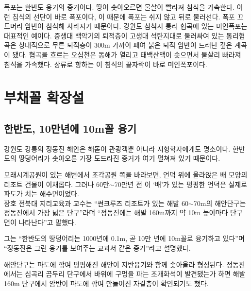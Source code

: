 \documentclass[12pt,a4paper]{book}
\newcommand{\SectionMargin}			{\newpage  \null \vskip 0cm}
\begin{document}
폭포는 한반도 융기의 증거이다. 땅이 솟아오르면 물살이 빨라져 침식을 가속한다. 이런 침식의 선단이 바로 폭포이다, 이 때문에 폭포는 쉬지 않고 뒤로 물러선다. 폭포 끄트머리 암반이 침식해 사라지기 때문이다. 강원도 삼척시 통리 협곡에 있는 미인폭포는 대표적인 예이다. 중생대 백악기의 퇴적층이 고생대 석탄지대로 둘러싸여 있는 통리협곡은 상대적으로 무른 퇴적층이 300m 가까이 패여 붉은 퇴적 암반이 드러난 깊은 계곡이 됐다. 협곡을 흐르는 오십천은 동해가 열리고 태백산맥이 솟으면서 물살리 빠라져 침식을 가속했다. 상류로 향하는 이 침식의 끝자락이 바로 미인폭포이다.




		



	\SectionMargin
	\section{부채꼴 확장설}
	\null




		\subsection{한반도, 10만년에 10m꼴 융기}

		강원도 강릉의 정동진 해안은 해돋이 관광객뿐 아니라 지형학자에게도 명소이다. 
		한반도의 땅덩어리가 솟아오른 가장 도드라진 증거가 여기 펼쳐져 있기 때문이다.
 
		모래시계공원이 있는 해변에서 조각공원 쪽을 바라보면, 언덕 위에 올라앉은 배 모양의 리조트 건물이 이채롭다. 
		그러나 60만$\sim$70만년 전 이 `배'가 있는 평평한 언덕은 실제로 파도가 치는 해수면이었다. 
		\\[-1.0em]
 




 
		장호 전북대 지리교육과 교수는 “썬크루즈 리조트가 있는 해발 60$\sim$70m의 해안단구는 정동진에서 가장 넓은 단구”라며 
		``정동진에는 해발 160m까지 약 10m 높이마다 단구 면이 나타난다''고 말했다.
 
		그는 ``한반도의 땅덩어리는 1000년에 0.1m, 곧 10만 년에 10m꼴로 융기하고 있다''며 
		``정동진은 그런 융기를 보여주는 교과서 같은 증거''라고 설명했다.
 
		해안단구는 파도에 깎여 평평해진 해안이 지반융기와 함께 솟아올라 형성된다. 
		정동진에서는 심곡리 곰두리 단구에서 바위에 구멍을 파는 조개화석이 발견됐는가 하면 
		해발 160m 단구에서 암반이 파도에 깎여 만들어진 자갈층이 확인되기도 했다.
 
\end{document}
